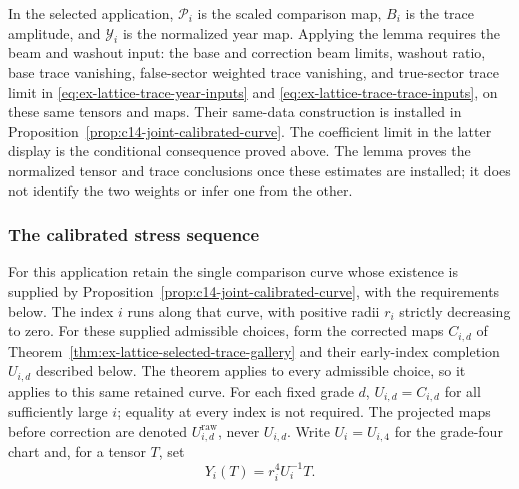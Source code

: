 In the selected application, $\mathcal P_i$ is the scaled comparison map,
$B_i$ is the trace amplitude, and $\mathcal Y_i$ is the normalized year
map. Applying the lemma requires the beam and washout input: the base
and correction beam limits, washout ratio, base trace vanishing,
false-sector weighted trace vanishing, and true-sector trace limit in
\eqref{eq:ex-lattice-trace-year-inputs} and
\eqref{eq:ex-lattice-trace-trace-inputs}, on these same tensors and maps.
Their same-data construction is installed in Proposition~\ref{prop:c14-joint-calibrated-curve}. The coefficient limit in
the latter display is the conditional consequence proved above. The lemma proves the normalized tensor
and trace conclusions once these estimates are installed; it does not
identify the two weights or infer one from the other.

\subsubsection{The calibrated stress sequence}

For this application retain the single comparison curve whose existence
is supplied by Proposition~\ref{prop:c14-joint-calibrated-curve}, with the requirements below. The index $i$ runs along that curve,
with positive radii $r_i$ strictly decreasing to zero. For these supplied
admissible choices, form the corrected
maps $C_{i,d}$ of Theorem~\ref{thm:ex-lattice-selected-trace-gallery}
and their early-index completion $U_{i,d}$ described below. The theorem
applies to every admissible choice, so it applies to this same retained
curve. For each fixed grade $d$, $U_{i,d}=C_{i,d}$ for all sufficiently
large $i$; equality at every index is not required. The projected maps
before correction are denoted $U^{\mathrm{raw}}_{i,d}$, never $U_{i,d}$.
Write $U_i=U_{i,4}$ for the grade-four chart and, for a tensor $T$, set
\[
 Y_i(T)=r_i^4U_i^{-1}T.
\]

